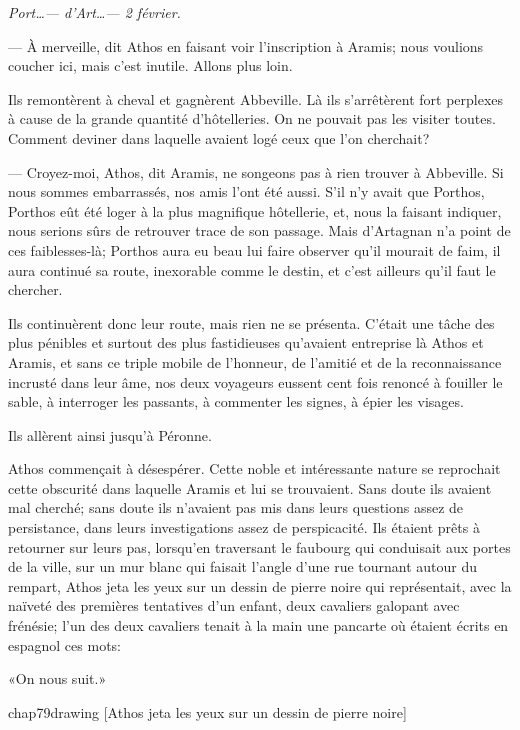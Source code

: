 \textit{Port\dots — d'Art\dots — 2 février.}

— À merveille, dit Athos en faisant voir l'inscription à Aramis; nous voulions coucher ici, mais c'est inutile. Allons plus loin.

Ils remontèrent à cheval et gagnèrent Abbeville. Là ils s'arrêtèrent fort perplexes à cause de la grande quantité d'hôtelleries. On ne pouvait pas les visiter toutes. Comment deviner dans laquelle avaient logé ceux que l'on cherchait?

— Croyez-moi, Athos, dit Aramis, ne songeons pas à rien trouver à Abbeville. Si nous sommes embarrassés, nos amis l'ont été aussi. S'il n'y avait que Porthos, Porthos eût été loger à la plus magnifique hôtellerie, et, nous la faisant indiquer, nous serions sûrs de retrouver trace de son passage. Mais d'Artagnan n'a point de ces faiblesses-là; Porthos aura eu beau lui faire observer qu'il mourait de faim, il aura continué sa route, inexorable comme le destin, et c'est ailleurs qu'il faut le chercher.

Ils continuèrent donc leur route, mais rien ne se présenta. C'était une tâche des plus pénibles et surtout des plus fastidieuses qu'avaient entreprise là Athos et Aramis, et sans ce triple mobile de l'honneur, de l'amitié et de la reconnaissance incrusté dans leur âme, nos deux voyageurs eussent cent fois renoncé à fouiller le sable, à interroger les passants, à commenter les signes, à épier les visages.

Ils allèrent ainsi jusqu'à Péronne.

Athos commençait à désespérer. Cette noble et intéressante nature se reprochait cette obscurité dans laquelle Aramis et lui se trouvaient. Sans doute ils avaient mal cherché; sans doute ils n'avaient pas mis dans leurs questions assez de persistance, dans leurs investigations assez de perspicacité. Ils étaient prêts à retourner sur leurs pas, lorsqu'en traversant le faubourg qui conduisait aux portes de la ville, sur un mur blanc qui faisait l'angle d'une rue tournant autour du rempart, Athos jeta les yeux sur un dessin de pierre noire qui représentait, avec la naïveté des premières tentatives d'un enfant, deux cavaliers galopant avec frénésie; l'un des deux cavaliers tenait à la main une pancarte où étaient écrits en espagnol ces mots:

«On nous suit.»

\begin{bwbigpic}
	[\basicscale] 
	{chap79drawing}
	[Athos jeta les yeux sur un dessin de pierre noire]
\end{bwbigpic}

